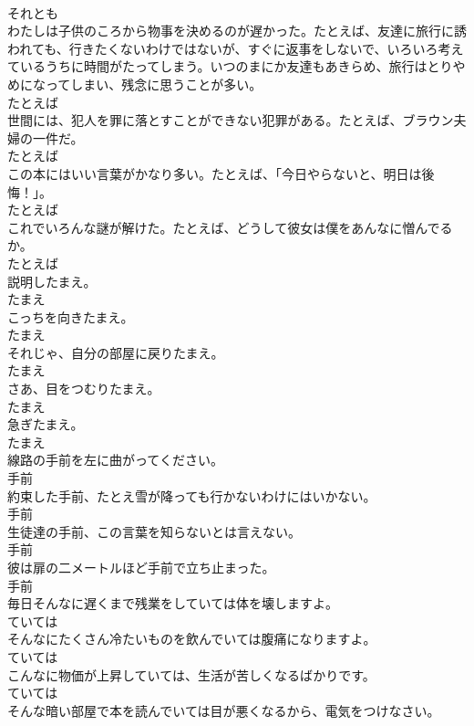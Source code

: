 \documentclass[8pt]{extreport}
\begin{document}
\begin{CJK}{UTF8}{min}
\\	それとも	
\\	わたしは子供のころから物事を決めるのが遅かった。たとえば、友達に旅行に誘われても、行きたくないわけではないが、すぐに返事をしないで、いろいろ考えているうちに時間がたってしまう。いつのまにか友達もあきらめ、旅行はとりやめになってしまい、残念に思うことが多い。	
\\	たとえば	
\\	世間には、犯人を罪に落とすことができない犯罪がある。たとえば、ブラウン夫婦の一件だ。	
\\	たとえば	
\\	この本にはいい言葉がかなり多い。たとえば、「今日やらないと、明日は後悔！」。	
\\	たとえば	
\\	これでいろんな謎が解けた。たとえば、どうして彼女は僕をあんなに憎んでるか。	
\\	たとえば	
\\	説明したまえ。	
\\	たまえ	
\\	こっちを向きたまえ。	
\\	たまえ	
\\	それじゃ、自分の部屋に戻りたまえ。	
\\	たまえ	
\\	さあ、目をつむりたまえ。	
\\	たまえ	
\\	急ぎたまえ。	
\\	たまえ	
\\	線路の手前を左に曲がってください。	
\\	手前	
\\	約束した手前、たとえ雪が降っても行かないわけにはいかない。	
\\	手前	
\\	生徒達の手前、この言葉を知らないとは言えない。	
\\	手前	
\\	彼は扉の二メートルほど手前で立ち止まった。	
\\	手前	
\\	毎日そんなに遅くまで残業をしていては体を壊しますよ。	
\\	ていては	
\\	そんなにたくさん冷たいものを飲んでいては腹痛になりますよ。	
\\	ていては	
\\	こんなに物価が上昇していては、生活が苦しくなるばかりです。	
\\	ていては	
\\	そんな暗い部屋で本を読んでいては目が悪くなるから、電気をつけなさい。	

\end{CJK}
\end{document}
